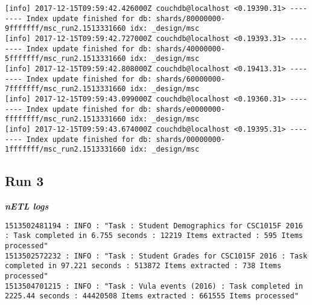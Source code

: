 \begin{verbatim}
[info] 2017-12-15T09:59:42.426000Z couchdb@localhost <0.19390.31> -------- Index update finished for db: shards/80000000-9fffffff/msc_run2.1513331660 idx: _design/msc
[info] 2017-12-15T09:59:42.727000Z couchdb@localhost <0.19393.31> -------- Index update finished for db: shards/40000000-5fffffff/msc_run2.1513331660 idx: _design/msc
[info] 2017-12-15T09:59:42.808000Z couchdb@localhost <0.19413.31> -------- Index update finished for db: shards/60000000-7fffffff/msc_run2.1513331660 idx: _design/msc
[info] 2017-12-15T09:59:43.099000Z couchdb@localhost <0.19360.31> -------- Index update finished for db: shards/e0000000-ffffffff/msc_run2.1513331660 idx: _design/msc
[info] 2017-12-15T09:59:43.674000Z couchdb@localhost <0.19395.31> -------- Index update finished for db: shards/00000000-1fffffff/msc_run2.1513331660 idx: _design/msc
\end{verbatim}


\subsection{Run 3}
\textit{\textbf{nETL logs}}
\begin{verbatim}
1513502481194 : INFO : "Task : Student Demographics for CSC1015F 2016 : Task completed in 6.755 seconds : 12219 Items extracted : 595 Items processed"
1513502572232 : INFO : "Task : Student Grades for CSC1015F 2016 : Task completed in 97.221 seconds : 513872 Items extracted : 738 Items processed"
1513504701215 : INFO : "Task : Vula events (2016) : Task completed in 2225.44 seconds : 44420508 Items extracted : 661555 Items processed"
\end{verbatim}

